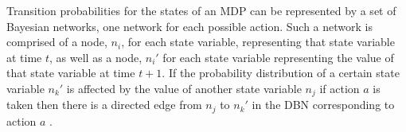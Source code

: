 Transition probabilities for the states of an MDP can be represented by a set
of Bayesian networks, one network for each possible action. Such a network is
comprised of a node, $n_i$, for each state variable, representing that state
variable at time $t$, as well as a node, $n_i'$ for each state variable
representing the value of that state variable at time $t+1$. If the probability
distribution of a certain state variable $n_k'$ is affected by the value of
another state variable $n_j$ if action $a$ is taken then there is a directed
edge from $n_j$ to $n_k'$ in the DBN corresponding to action $a$
\parencite{guestrin2003efficient}.
